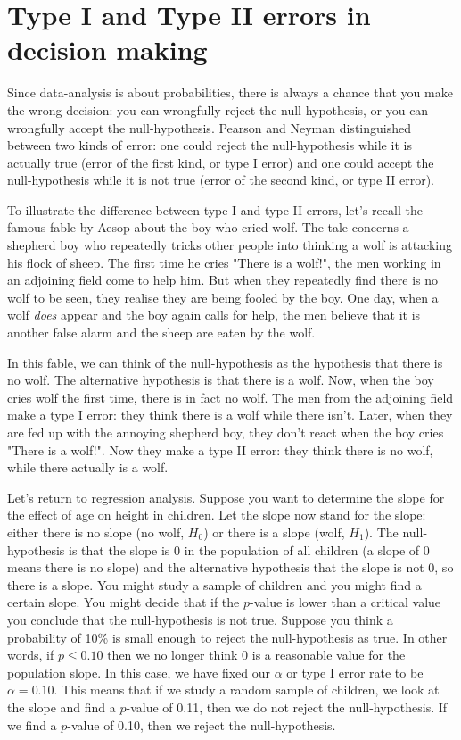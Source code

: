 \documentclass[]{report}\usepackage[]{graphicx}\usepackage[]{color}
\begin{document}
\section{Type I and Type II errors in decision making}


Since data-analysis is about probabilities, there is always a chance that you make the wrong decision: you can wrongfully reject the null-hypothesis, or you can wrongfully accept the null-hypothesis. Pearson and Neyman distinguished between two kinds of error: one could reject the null-hypothesis while it is actually true (error of the first kind, or type I error) and one could accept the null-hypothesis while it is not true (error of the second kind, or type II error).

To illustrate the difference between type I and type II errors, let's recall the famous fable by Aesop about the boy who cried wolf. The tale concerns a shepherd boy who repeatedly tricks other people into thinking a wolf is attacking his flock of sheep. The first time he cries "There is a wolf!", the men working in an adjoining field come to help him. But when they repeatedly find there is no wolf to be seen, they realise they are being fooled by the boy. One day, when a wolf \textit{does} appear and the boy again calls for help, the men believe that it is another false alarm and the sheep are eaten by the wolf.

In this fable, we can think of the null-hypothesis as the hypothesis that there is no wolf. The alternative hypothesis is that there is a wolf. Now, when the boy cries wolf the first time, there is in fact no wolf. The men from the adjoining field make a type I error: they think there is a wolf while there isn't. Later, when they are fed up with the annoying shepherd boy, they don't react when the boy cries "There is a wolf!". Now they make a type II error: they think there is no wolf, while there actually is a wolf.

Let's return to regression analysis. Suppose you want to determine the slope for the effect of age on height in children. Let the slope now stand for the slope: either there is no slope (no wolf, $H_0$) or there is a slope (wolf, $H_1$). The null-hypothesis is that the slope is 0 in the population of all children (a slope of 0 means there is no slope) and the alternative hypothesis that the slope is not 0, so there is a slope. You might study a sample of children and you might find a certain slope. You might decide that if the $p$-value is lower than a critical value you conclude that the null-hypothesis is not true. Suppose you think a probability of 10\% is small enough to reject the null-hypothesis as true. In other words, if $p \leq 0.10$ then we no longer think 0 is a reasonable value for the population slope. In this case, we have fixed our $\alpha$ or type I error rate to be $\alpha=0.10$. This means that if we study a random sample of children, we look at the slope and find a $p$-value of 0.11, then we do not reject the null-hypothesis. If we find a $p$-value of 0.10, then we reject the null-hypothesis.
\end{document}
